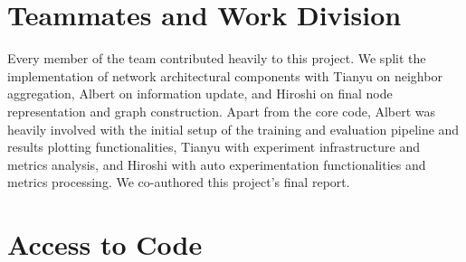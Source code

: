 \documentclass{article}
\begin{document}

\section{Teammates and Work Division}


Every member of the team contributed heavily to this project. We split the implementation of network architectural components with Tianyu on neighbor aggregation, Albert on information update, and Hiroshi on final node representation and graph construction. Apart from the core code, Albert was heavily involved with the initial setup of the training and evaluation pipeline and results plotting functionalities, Tianyu with experiment infrastructure and metrics analysis, and Hiroshi with auto experimentation functionalities and metrics processing. We co-authored this project's final report.

\section{Access to Code}
\end{document}
